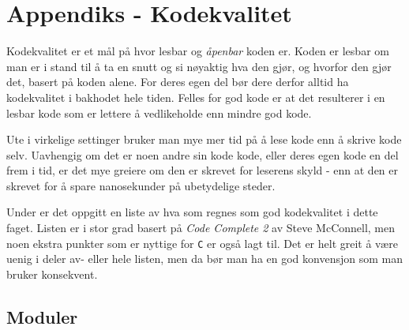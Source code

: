 \section{Appendiks - Kodekvalitet}\label{sec:app-kodekval}



Kodekvalitet er et mål på hvor lesbar og \textit{åpenbar} koden er. Koden er lesbar om man er i stand til å ta en snutt og si nøyaktig hva den gjør, og hvorfor den gjør det, basert på koden alene. For deres egen del bør dere derfor alltid ha kodekvalitet i bakhodet hele tiden. Felles for god kode er at det resulterer i en lesbar kode som er lettere å vedlikeholde enn mindre god kode. 

Ute i virkelige settinger bruker man mye mer tid på å lese kode enn å skrive kode selv. Uavhengig om det er noen andre sin kode kode, eller deres egen kode en del frem i tid, er det mye greiere om den er skrevet for leserens skyld - enn at den er skrevet for å spare nanosekunder på ubetydelige steder.

Under er det oppgitt en liste av hva som regnes som god kodekvalitet i dette faget. Listen er i  stor grad basert på \textit{Code Complete 2} av Steve McConnell, men noen ekstra punkter som er nyttige for \verb|C| er også lagt til. Det er helt greit å være uenig i deler av- eller hele listen, men da bør man ha en god konvensjon som man bruker konsekvent.




\subsection{Moduler}

